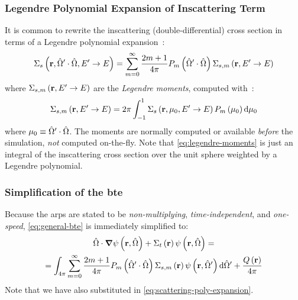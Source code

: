 \begin{frame}
  \frametitle{Legendre Polynomial Expansion of Inscattering Term}
  It is common to rewrite the inscattering (double-differential) cross section in terms of a Legendre polynomial expansion~\cite{Larsen2010}:
  \begin{equation}
    \label{eq:scattering-poly-expansion}
    \Sigma_s \left(\mathbf{r},\hat{\Omega}'\cdot \hat{\Omega},E'\rightarrow E\right) = \sum_{m=0}^{\infty}\frac{2m+1}{4\pi}P_m \left(\hat{\Omega}' \cdot \hat{\Omega} \right)\Sigma_{s,m}\left(\mathbf{r}, E'\rightarrow E\right)
  \end{equation}
  where $\Sigma_{s,m}\left(\mathbf{r}, E'\rightarrow E\right)$ are the \textit{Legendre moments}, computed with~\cite{TheoryManualOpenSn}:
  \begin{equation} \label{eq:legendre-moments}
    \Sigma_{s,m}\left(\mathbf{r}, E'\rightarrow E\right) = 2\pi \int_{-1}^{1}\Sigma_s \left(\mathbf{r},\mu_0,E'\rightarrow E\right)P_m \left(\mu_0\right)\dd \mu_0
  \end{equation}
  where $\mu_0 \equiv \hat{\Omega}' \cdot \hat{\Omega}$.
  The moments are normally computed or available \textit{before} the simulation, \textit{not} computed on-the-fly.
  Note that \cref{eq:legendre-moments} is just an integral of the inscattering cross section over the unit sphere weighted by a Legendre polynomial.
\end{frame}

\begin{frame}
  \frametitle{Simplification of the \gls{bte}}
  Because the \glspl{arp} are stated to be \textit{non-multiplying}, \textit{time-independent}, and \textit{one-speed}, \cref{eq:general-bte} is immediately simplified to:
  \begin{multline}\label{eq:first-simplification-bte}
    \hat{\Omega} \cdot \grad \psi\left(\mathbf{r},\hat{\Omega}\right) + \Sigma_t \left(\mathbf{r}\right)\psi\left(\mathbf{r},\hat{\Omega}\right) =\\=\int_{4\pi}\sum_{m=0}^{\infty}\frac{2m+1}{4\pi}P_m \left(\hat{\Omega}' \cdot \hat{\Omega} \right)\Sigma_{s,m}\left(\mathbf{r}\right)\psi \left(\mathbf{r},\hat{\Omega}'\right) \dd \hat{\Omega}' + \frac{Q\left(\mathbf{r}\right)}{4\pi}
  \end{multline}
  Note that we have also substituted in \cref{eq:scattering-poly-expansion}.
\end{frame}

